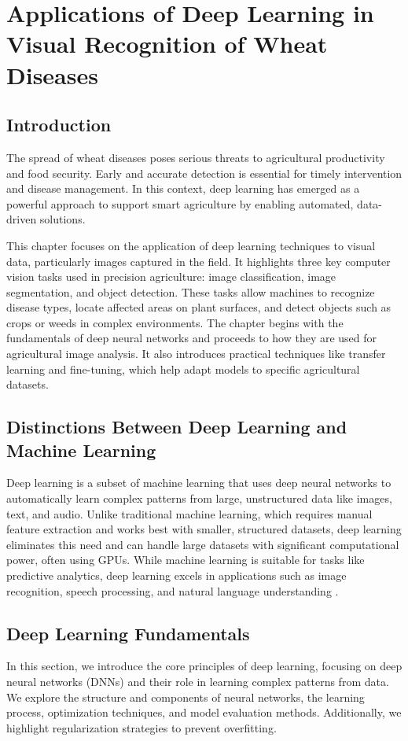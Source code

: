 
\chapter{Applications of Deep Learning in Visual Recognition of Wheat Diseases}

\section{Introduction}
The spread of wheat diseases poses serious threats to agricultural productivity and food security. Early and accurate detection is essential for timely intervention and disease management. In this context, deep learning has emerged as a powerful approach to support smart agriculture by enabling automated, data-driven solutions.

This chapter focuses on the application of deep learning techniques to visual data, particularly images captured in the field. It highlights three key computer vision tasks used in precision agriculture: image classification, image segmentation, and object detection. These tasks allow machines to recognize disease types, locate affected areas on plant surfaces, and detect objects such as crops or weeds in complex environments. The chapter begins with the fundamentals of deep neural networks and proceeds to how they are used for agricultural image analysis. It also introduces practical techniques like transfer learning and fine-tuning, which help adapt models to specific agricultural datasets.

\section{Distinctions Between Deep Learning and Machine Learning}
Deep learning is a subset of machine learning that uses deep neural networks to automatically learn complex patterns from large, unstructured data like images, text, and audio. Unlike traditional machine learning, which requires manual feature extraction and works best with smaller, structured datasets, deep learning eliminates this need and can handle large datasets with significant computational power, often using GPUs. While machine learning is suitable for tasks like predictive analytics, deep learning excels in applications such as image recognition, speech processing, and natural language understanding \parencite{AlvarezVanhard2021}.
\section{Deep Learning Fundamentals}
In this section, we introduce the core principles of deep learning, focusing on deep neural networks (DNNs) and their role in learning complex patterns from data. We explore the structure and components of neural networks, the learning process, optimization techniques, and model evaluation methods. Additionally, we highlight regularization strategies to prevent overfitting.

